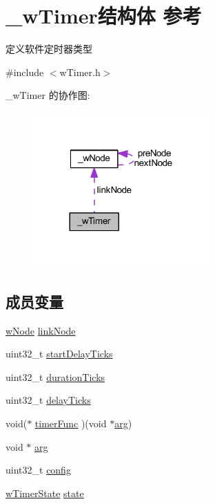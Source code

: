 \hypertarget{struct__w_timer}{}\section{\+\_\+w\+Timer结构体 参考}
\label{struct__w_timer}


定义软件定时器类型  




{\ttfamily \#include $<$w\+Timer.\+h$>$}



\+\_\+w\+Timer 的协作图\+:
\nopagebreak
\begin{figure}[H]
\begin{center}
\leavevmode
\includegraphics[width=192pt]{struct__w_timer__coll__graph}
\end{center}
\end{figure}
\subsection*{成员变量}
\begin{DoxyCompactItemize}
\item 
\mbox{\hyperlink{w_lib_8h_a98363f2fc9ff1bef5993786140d900f2}{w\+Node}} \mbox{\hyperlink{struct__w_timer_aace0256afebaf717de11433d186f53b2}{link\+Node}}
\item 
uint32\+\_\+t \mbox{\hyperlink{struct__w_timer_acecf013811265c398517a464e7e6f7b2}{start\+Delay\+Ticks}}
\item 
uint32\+\_\+t \mbox{\hyperlink{struct__w_timer_a95f8cbd7a4ba89fc9ae542eb04a24bc0}{duration\+Ticks}}
\item 
uint32\+\_\+t \mbox{\hyperlink{struct__w_timer_a0c1ef2b42e60232fd2355246df290c68}{delay\+Ticks}}
\item 
void($\ast$ \mbox{\hyperlink{struct__w_timer_a5b39f4308b8e715d9278cbf70f7297c7}{timer\+Func}} )(void $\ast$\mbox{\hyperlink{struct__w_timer_a9ce2ec4812a92cb6ab39f6e81e9173a9}{arg}})
\item 
void $\ast$ \mbox{\hyperlink{struct__w_timer_a9ce2ec4812a92cb6ab39f6e81e9173a9}{arg}}
\item 
uint32\+\_\+t \mbox{\hyperlink{struct__w_timer_ac0c635110dc503f164fff91b163936d7}{config}}
\item 
\mbox{\hyperlink{w_timer_8h_afd5ce485f9f6080eb16b9b0d11c09dcd}{w\+Timer\+State}} \mbox{\hyperlink{struct__w_timer_ac82a56d0e6704cdcfdad6e80803b1674}{state}}
\end{DoxyCompactItemize}


